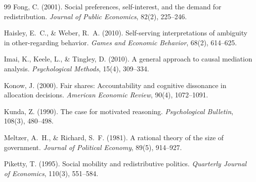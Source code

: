 \documentclass[12pt]{article}
\begin{document}
\begin{thebibliography}{99}
Fong, C. (2001).
Social preferences, self-interest, and the demand for redistribution.
\textit{Journal of Public Economics}, 82(2), 225--246.

Haisley, E.~C., \& Weber, R.~A. (2010).
Self-serving interpretations of ambiguity in other-regarding behavior.
\textit{Games and Economic Behavior}, 68(2), 614--625.

Imai, K., Keele, L., \& Tingley, D. (2010).
A general approach to causal mediation analysis.
\textit{Psychological Methods}, 15(4), 309--334.

Konow, J. (2000).
Fair shares: Accountability and cognitive dissonance in allocation decisions.
\textit{American Economic Review}, 90(4), 1072--1091.

Kunda, Z. (1990).
The case for motivated reasoning.
\textit{Psychological Bulletin}, 108(3), 480--498.

Meltzer, A.~H., \& Richard, S.~F. (1981).
A rational theory of the size of government.
\textit{Journal of Political Economy}, 89(5), 914--927.

Piketty, T. (1995).
Social mobility and redistributive politics.
\textit{Quarterly Journal of Economics}, 110(3), 551--584.

\end{thebibliography}
\end{document}
